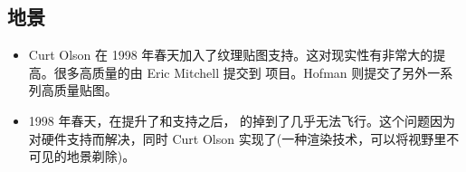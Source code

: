 \subsection{地景}
\fi
\iffalse
\IfLanguageName{english}{
\subsection{Scenery}\index{history!scenery}
}{}
\IfLanguageName{french}{
\subsection{Sc\`{e}nes}\index{histoire!sc\`{e}nes}
}{}
\fi
\begin{itemize}
\ifchinese
\item Curt Olson 在 1998 年春天加入了纹理贴图支持。这对现实性有非常大的提高。很多高质量的由 Eric Mitchell 提交到 \FlightGear{} 项目。Hofman 则提交了另外一系列高质量贴图。
\fi
\iffalse
\IfLanguageName{english}{
\item Texture support\index{textures} was added by Curt
Olson\index{Olson, Curt} in spring 1998. This marked a significant
improvement in terms of reality. Some high-quality \Index{textures} were
submitted by Eric Mitchell\index{Mitchell, Eric} for the \FlightGear{}
project. Another set of high-quality textures was added by Erik
Hofman\index{Hofman, Erik} ever since.
}{}
\IfLanguageName{french}{
\item La prise en charge des textures\index{textures} a \'{e}t\'{e} ajout\'{e}
par Curt Olson\index{Olson, Curt} \`{a} l'automne 1998. Ceci a marqu\'{e} un tournant
important en termes de r\'{e}alisme. Quelques \Index{textures} de haute qualit\'{e} pour
le projet \FlightGear{} ont \'{e}t\'{e} ajout\'{e}es par Eric Mitchell\index{Mitchell, Eric}.
Depuis, d'autres textures de haute qualit\'{e} ont \'{e}t\'{e} ajout\'{e}es par Erik Hofman\index{Hofman, Erik}.
}{}
\fi

\ifchinese
\item 1998 年春天，在提升了和支持之后，\FlightGear{} 的掉到了几乎无法飞行。这个问题因为  对硬件支持而解决，同时 Curt Olson 实现了(一种渲染技术，可以将视野里不可见的地景剃除)。


\end{itemize}
